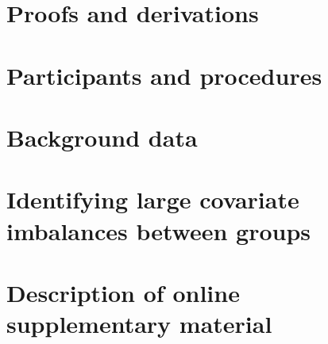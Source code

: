 \documentclass[12pt]{article}
\begin{document}
\begin{appendices}

  \startcontents[sections]

  \clearpage

\section{Proofs and derivations}

    \label{appendix:theory}

    


    \clearpage

\section{Participants and procedures}

    \label{appendix:participants}

    


    \clearpage

\section{Background data}

    \label{appendix:background}

    


    \clearpage

\section{Identifying large covariate imbalances between groups}

    \label{appendix:largeImbalances}

    


    \clearpage

  \section{Description of online supplementary material}

  \label{appendix:onlineSupplementaryMaterial}

  

\end{appendices}
\end{document}
